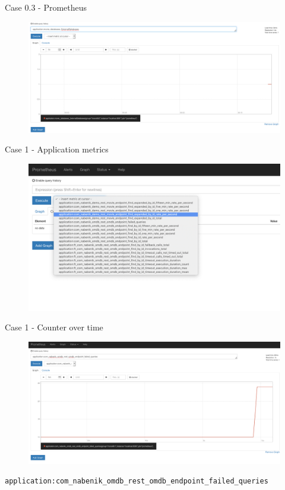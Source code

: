 \documentclass{beamer}
\begin{document}
\begin{frame}[fragile]{Case 0.3 - Prometheus}
\begin{figure}
	\centering
	\includegraphics[width=\linewidth]{Images/gauge}
\end{figure}

\end{frame}

\begin{frame}{Case 1 - Application metrics}
\begin{figure}
	\centering
	\includegraphics[width=\linewidth]{Images/micrometric1}
\end{figure}

\end{frame}

\begin{frame}{Case 1 - Counter over time}

\begin{figure}
	\centering
	\includegraphics[width=\linewidth]{Images/micrometric2}
\end{figure}
\lstinline|application:com_nabenik_omdb_rest_omdb_endpoint_failed_queries|
\end{frame}
\end{document}

